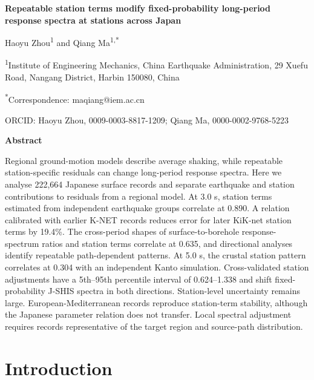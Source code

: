 \documentclass[11pt]{article}
\begin{document}
\pagestyle{plain}

\begin{center}
{\LARGE\bfseries Repeatable station terms modify fixed-probability long-period response spectra at stations across Japan\par}
\vspace{0.6em}
{\large Haoyu Zhou\textsuperscript{1} and Qiang Ma\textsuperscript{1,*}\par}
\vspace{0.3em}
{\small \textsuperscript{1}Institute of Engineering Mechanics, China Earthquake Administration, 29 Xuefu Road, Nangang District, Harbin 150080, China\par}
{\small \textsuperscript{*}Correspondence: maqiang@iem.ac.cn\par}
{\small ORCID: Haoyu Zhou, 0009-0003-8817-1209; Qiang Ma, 0000-0002-9768-5223\par}
\end{center}

\vspace{0.8em}

\noindent\textbf{Abstract}

Regional ground-motion models describe average shaking, while repeatable station-specific residuals can change long-period response spectra. Here we analyse 222,664 Japanese surface records and separate earthquake and station contributions to residuals from a regional model. At 3.0 s, station terms estimated from independent earthquake groups correlate at 0.890. A relation calibrated with earlier K-NET records reduces error for later KiK-net station terms by 19.4\%. The cross-period shapes of surface-to-borehole response-spectrum ratios and station terms correlate at 0.635, and directional analyses identify repeatable path-dependent patterns. At 5.0 s, the crustal station pattern correlates at 0.304 with an independent Kanto simulation. Cross-validated station adjustments have a 5th--95th percentile interval of 0.624--1.338 and shift fixed-probability J-SHIS spectra in both directions. Station-level uncertainty remains large. European-Mediterranean records reproduce station-term stability, although the Japanese parameter relation does not transfer. Local spectral adjustment requires records representative of the target region and source-path distribution.

\section{Introduction}
\end{document}
